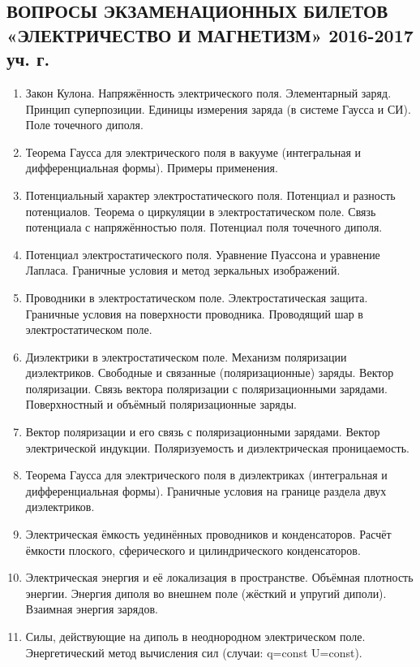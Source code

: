 \documentclass[9pt,a4paper]{article}
\begin{document}
\begin{center}
\subsection*{ВОПРОСЫ ЭКЗАМЕНАЦИОННЫХ БИЛЕТОВ \\ «ЭЛЕКТРИЧЕСТВО И МАГНЕТИЗМ» 2016-2017 уч. г.}
\end{center}
\begin{enumerate}
\item Закон Кулона. Напряжённость электрического поля. Элементарный заряд. Принцип суперпозиции. Единицы измерения заряда (в системе Гаусса и СИ). Поле точечного диполя.
\item Теорема Гаусса для электрического поля в вакууме (интегральная и дифференциальная формы). Примеры применения. 
\item Потенциальный характер электростатического поля. Потенциал и разность потенциалов. Теорема о циркуляции в электростатическом поле. Связь потенциала с напряжённостью поля. Потенциал поля точечного диполя.  
\item Потенциал электростатического поля. Уравнение Пуассона и уравнение Лапласа. Граничные условия и метод зеркальных изображений. 
\item Проводники в электростатическом поле. Электростатическая защита. Граничные условия на поверхности проводника. Проводящий шар в электростатическом поле.  
\item Диэлектрики в электростатическом поле. Механизм поляризации диэлектриков. Свободные и связанные (поляризационные) заряды. Вектор поляризации. Связь вектора поляризации с поляризационными зарядами. Поверхностный и объёмный поляризационные заряды.  
\item Вектор поляризации и его связь с поляризационными зарядами. Вектор электрической индукции. Поляризуемость и диэлектрическая проницаемость. 
\item Теорема Гаусса для электрического поля в диэлектриках (интегральная и дифференциальная формы). Граничные условия на границе раздела двух диэлектриков.  
\item Электрическая ёмкость уединённых проводников и конденсаторов. Расчёт ёмкости плоского, сферического и цилиндрического
конденсаторов.
\item Электрическая энергия и её локализация в пространстве. Объёмная плотность энергии. Энергия диполя во внешнем поле (жёсткий и
упругий диполи). Взаимная энергия зарядов.
\item Силы, действующие на диполь в неоднородном электрическом поле. Энергетический метод вычисления сил (случаи: q=const U=const).

\end{enumerate}
\end{document}
